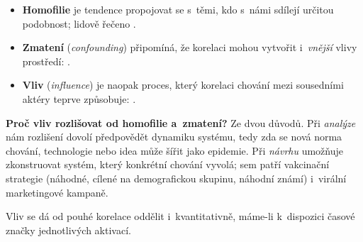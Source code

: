 \documentclass[11pt,a4paper]{article}
\theoremstyle{definition}
\begin{document}
\begin{defbox}
\begin{itemize}
\item \textbf{Homofilie} je tendence propojovat se s~těmi, kdo s~námi sdílejí určitou
      podobnost; lidově řečeno .
\item \textbf{Zmatení} (\emph{confounding}) připomíná, že korelaci mohou vytvořit i~\emph{vnější}
      vlivy prostředí: .
\item \textbf{Vliv} (\emph{influence}) je naopak proces, který korelaci chování mezi sousedními
      aktéry teprve způsobuje: .
\end{itemize}
\textbf{Proč vliv rozlišovat od homofilie a~zmatení?} Ze dvou důvodů. Při \emph{analýze} nám
rozlišení dovolí předpovědět dynamiku systému, tedy zda se nová norma chování, technologie nebo
idea může šířit jako epidemie. Při \emph{návrhu} umožňuje zkonstruovat systém, který konkrétní
chování vyvolá; sem patří vakcinační strategie (náhodné, cílené na demografickou skupinu,
náhodní známí) i~virální marketingové kampaně.
\end{defbox}

Vliv se dá od pouhé korelace oddělit i~kvantitativně, máme-li k~dispozici časové značky
jednotlivých aktivací.
\end{document}
